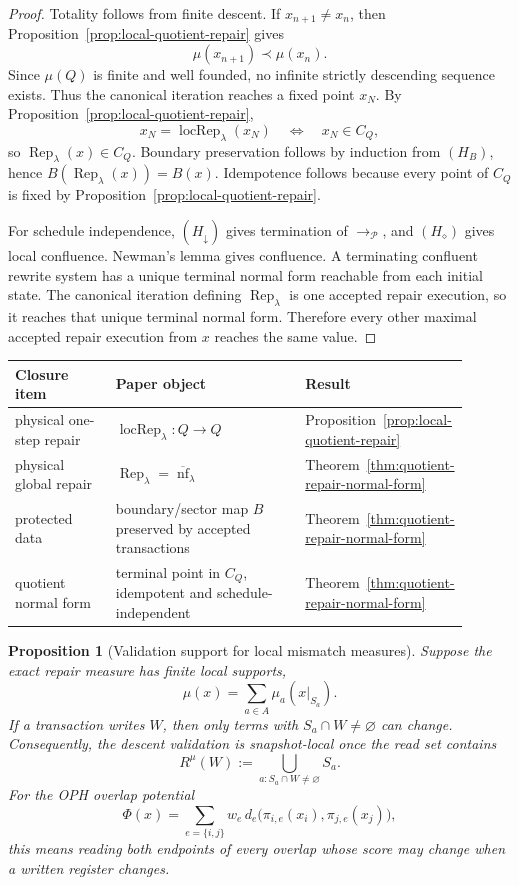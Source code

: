 \documentclass[11pt]{article}
\newtheorem{proposition}[theorem]{Proposition}
\theoremstyle{remark}
\theoremstyle{plain}
\begin{document}
\begin{proof}
Totality follows from finite descent.  If \(x_{n+1}\ne x_n\), then
Proposition~\ref{prop:local-quotient-repair} gives
\[
\mu(x_{n+1})\prec\mu(x_n).
\]
Since \(\mu(Q)\) is finite and well founded, no infinite strictly descending sequence exists.
Thus the canonical iteration reaches a fixed point \(x_N\).  By
Proposition~\ref{prop:local-quotient-repair},
\[
x_N=\operatorname{locRep}_\lambda(x_N)
\quad\Longleftrightarrow\quad
x_N\in C_Q,
\]
so \(\operatorname{Rep}_\lambda(x)\in C_Q\).  Boundary preservation follows by induction from
\((H_B)\), hence \(B(\operatorname{Rep}_\lambda(x))=B(x)\).  Idempotence follows because every
point of \(C_Q\) is fixed by Proposition~\ref{prop:local-quotient-repair}.

For schedule independence, \((H_\downarrow)\) gives termination of \(\to_{\mathcal P}\), and
\((H_\diamond)\) gives local confluence.  Newman's lemma gives confluence.  A terminating
confluent rewrite system has a unique terminal normal form reachable from each initial state.  The
canonical iteration defining \(\operatorname{Rep}_\lambda\) is one accepted repair execution, so it
reaches that unique terminal normal form.  Therefore every other maximal accepted repair execution
from \(x\) reaches the same value.
\end{proof}

\begin{center}
\small
\begin{tabular}{@{}p{0.24\linewidth}p{0.46\linewidth}p{0.20\linewidth}@{}}
\textbf{Closure item} & \textbf{Paper object} & \textbf{Result} \\
\hline
physical one-step repair & \(\operatorname{locRep}_\lambda:Q\to Q\) &
Proposition~\ref{prop:local-quotient-repair} \\
physical global repair & \(\operatorname{Rep}_\lambda=\overline{\operatorname{nf}}_\lambda\) &
Theorem~\ref{thm:quotient-repair-normal-form} \\
protected data & boundary/sector map \(B\) preserved by accepted transactions &
Theorem~\ref{thm:quotient-repair-normal-form} \\
quotient normal form & terminal point in \(C_Q\), idempotent and schedule-independent &
Theorem~\ref{thm:quotient-repair-normal-form} \\
\end{tabular}
\end{center}

\begin{proposition}[Validation support for local mismatch measures]\label{prop:validation-support}
Suppose the exact repair measure has finite local supports,
\[
\mu(x)=\sum_{a\in A}\mu_a(x|_{S_a}).
\]
If a transaction writes \(W\), then only terms with \(S_a\cap W\ne\varnothing\) can change.
Consequently, the descent validation is snapshot-local once the read set contains
\[
R^\mu(W):=\bigcup_{a:S_a\cap W\ne\varnothing}S_a .
\]
For the OPH overlap potential
\[
\Phi(x)=\sum_{e=\{i,j\}}w_e\,d_e\!\bigl(\pi_{i,e}(x_i),\pi_{j,e}(x_j)\bigr),
\]
this means reading both endpoints of every overlap whose score may change when a written register
changes.
\end{proposition}
\end{document}
